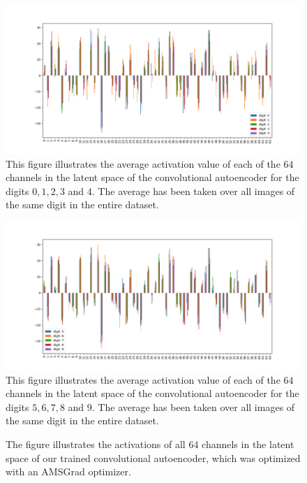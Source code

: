 \begin{figure}
\begin{center}
   \begin{minipage}[b]{\linewidth}
      \includegraphics[width=\linewidth]{convolutional_AE_latent_0}
      This figure illustrates the average activation value of each of the $64$ channels in the latent space of the convolutional autoencoder for the digits $0, 1, 2, 3$ and  $4$. The average has been taken over all images of the same digit in the entire dataset.
	\end{minipage}
   \begin{minipage}[b]{\linewidth}
      \includegraphics[width=\linewidth]{convolutional_AE_latent_1}
      This figure illustrates the average activation value of each of the $64$ channels in the latent space of the convolutional autoencoder for the digits $5, 6, 7, 8$ and $9$. The average has been taken over all images of the same digit in the entire dataset.
	\end{minipage}
\end{center}
\caption{The figure illustrates the activations of all $64$ channels in the latent space of our trained convolutional autoencoder, which was optimized with an AMSGrad optimizer.}\label{fig:convolutional_AE_latent}
\end{figure}

